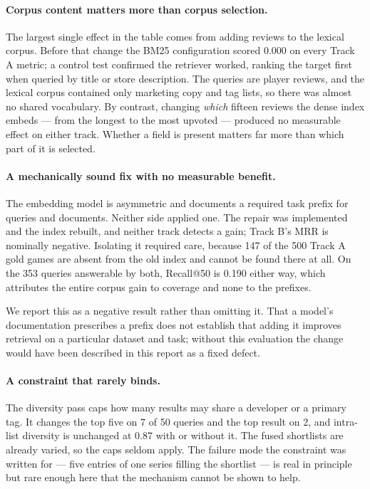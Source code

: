 \paragraph{Corpus content matters more than corpus selection.}
The largest single effect in the table comes from adding reviews to the lexical
corpus. Before that change the BM25 configuration scored 0.000 on every Track A
metric; a control test confirmed the retriever worked, ranking the target first
when queried by title or store description. The queries are player reviews, and
the lexical corpus contained only marketing copy and tag lists, so there was
almost no shared vocabulary. By contrast, changing \emph{which} fifteen reviews
the dense index embeds --- from the longest to the most upvoted --- produced no
measurable effect on either track. Whether a field is present matters far more
than which part of it is selected.

\paragraph{A mechanically sound fix with no measurable benefit.}
The embedding model is asymmetric and documents a required task prefix for
queries and documents. Neither side applied one. The repair was implemented and
the index rebuilt, and neither track detects a gain; Track B's MRR is
nominally negative. Isolating it required care, because 147 of the 500 Track A
gold games are absent from the old index and cannot be found there at all. On
the 353 queries answerable by both, Recall@50 is 0.190 either way, which
attributes the entire corpus gain to coverage and none to the prefixes.

We report this as a negative result rather than omitting it. That a model's
documentation prescribes a prefix does not establish that adding it improves
retrieval on a particular dataset and task; without this evaluation the change
would have been described in this report as a fixed defect.

\paragraph{A constraint that rarely binds.}
The diversity pass caps how many results may share a developer or a primary
tag. It changes the top five on 7 of 50 queries and the top result on 2, and
intra-list diversity is unchanged at 0.87 with or without it. The fused
shortlists are already varied, so the caps seldom apply. The failure mode the
constraint was written for --- five entries of one series filling the
shortlist --- is real in principle but rare enough here that the mechanism
cannot be shown to help.


